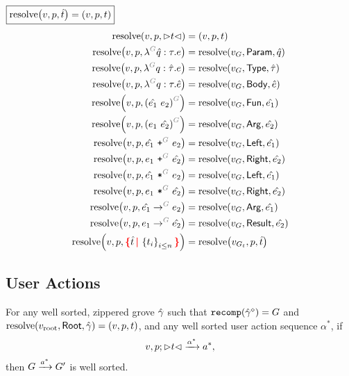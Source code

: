 \noindent
$\boxed{\operatorname{\text{resolve}}\mathopen{}\left(v, p, \hat{t}\right)\mathclose{} = (v, p, t)}$
%
\begin{align*}
  \resolve{v}{p}{\cursor{t}} &= (v, p, t) \\
  \resolve{v}{p}{\eFun{G}{\Z{q}}{\tau}{e}} &= \resolve{v_G}{\LamParam}{\Z{q}} \\
  \resolve{v}{p}{\eFun{G}{q}{\Z{\tau}}{e}} &= \resolve{v_G}{\LamType}{\Z{\tau}} \\
  \resolve{v}{p}{\eFun{G}{q}{\tau}{\Z{e}}} &= \resolve{v_G}{\LamBody}{\Z{e}} \\
  \resolve{v}{p}{\eApp{G}{\Z{e_1}}{e_2}} &= \resolve{v_G}{\AppFun}{\Z{e_1}} \\
  \resolve{v}{p}{\eApp{G}{e_1}{\Z{e_2}}} &= \resolve{v_G}{\AppArg}{\Z{e_2}} \\
  \resolve{v}{p}{\ePlus{G}{\Z{e_1}}{e_2}} &= \resolve{v_G}{\PlusLeft}{\Z{e_1}} \\
  \resolve{v}{p}{\ePlus{G}{e_1}{\Z{e_2}}} &= \resolve{v_G}{\PlusRight}{\Z{e_2}} \\
  \resolve{v}{p}{\eTimes{G}{\Z{e_1}}{e_2}} &= \resolve{v_G}{\TimesLeft}{\Z{e_1}} \\
  \resolve{v}{p}{\eTimes{G}{e_1}{\Z{e_2}}} &= \resolve{v_G}{\TimesRight}{\Z{e_2}} \\
  \resolve{v}{p}{\tArrow{G}{\Z{e_1}}{e_2}} &= \resolve{v_G}{\ArrowArg}{\Z{e_1}} \\
  \resolve{v}{p}{\tArrow{G}{e_1}{\Z{e_2}}} &= \resolve{v_G}{\ArrowResult}{\Z{e_2}} \\
  \resolve{v}{p}{\conflictHole{\Z{t}, \SetOf{t_i}_{i \leq n}}} &= \resolve{v_{G_t}}{p}{\Z{t}} \\
\end{align*}


\subsection{User Actions}

\begin{theorem}[Sensibility]
  For any well sorted, zippered grove $\hat{\gamma}$
  such that $\operatorname{\texttt{recomp}}\mathopen{}\left(\hat{\gamma}\mathclose{}^{\diamond}\mathclose{}\right)\mathclose{} = G$
    and $\operatorname{\text{resolve}}\mathopen{}\left(v_\text{root}, \mathsf{Root}, \hat{\gamma}\right)\mathclose{} = (v, p, t)$,
  and any well sorted user action sequence $\alpha^{*}$,
  if
  \[
    v, p; {\vartriangleright}t{\vartriangleleft} \xrightarrow{\alpha^{*}} a^{*},
  \]
  then $G \xrightarrow{a^{*}} G'$ is well sorted.
\end{theorem}

